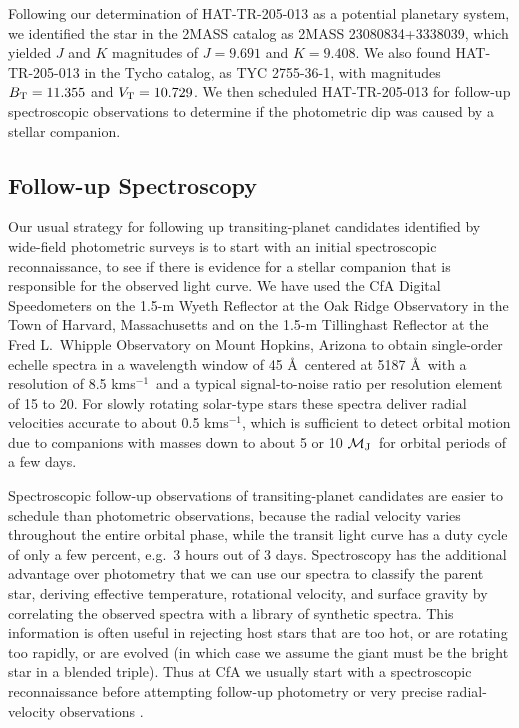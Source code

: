 \documentclass[12pt, preprint]{aastex}
\newcommand\kms{\ifmmode{\rm km\thinspace s^{-1}}\else km\thinspace s$^{-1}$\fi}
\newcommand\mjup{\ifmmode{{\cal M}_{\rm J}}\else ${\cal M}_{\rm J}$\fi}
\begin{document}
Following our determination of HAT-TR-205-013 as a potential planetary
system, we identified the star in the 2MASS catalog as 2MASS
23080834+3338039, which yielded $J$ and $K$ magnitudes of $J=9.691$ and
$K=9.408$. We also found HAT-TR-205-013 in the Tycho catalog, as TYC
2755-36-1, with magnitudes $B_{\rm T} = 11.355$ and $V_{\rm T} = 10.729$.
We then scheduled HAT-TR-205-013 for follow-up spectroscopic
observations to determine if the photometric dip was caused by a
stellar companion.

\subsection{Follow-up Spectroscopy} 

Our usual strategy for following up transiting-planet candidates
identified by wide-field photometric surveys is to start with an
initial spectroscopic reconnaissance, to see if there is evidence for
a stellar companion that is responsible for the observed light curve.
We have used the CfA Digital Speedometers \citep{latham1992} on the
1.5-m Wyeth Reflector at the Oak Ridge Observatory in the Town of
Harvard, Massachusetts and on the 1.5-m Tillinghast Reflector at the
Fred L.\ Whipple Observatory on Mount Hopkins, Arizona to obtain
single-order echelle spectra in a wavelength window of 45 \AA\
centered at 5187 \AA\, with a resolution of 8.5 \kms\ and a typical
signal-to-noise ratio per resolution element of 15 to 20.  For slowly
rotating solar-type stars these spectra deliver radial velocities
accurate to about 0.5 \kms, which is sufficient to detect orbital
motion due to companions with masses down to about 5 or 10 \mjup\ for
orbital periods of a few days.

Spectroscopic follow-up observations of transiting-planet candidates
are easier to schedule than photometric observations, because the
radial velocity varies throughout the entire orbital phase, while the
transit light curve has a duty cycle of only a few percent, e.g.\ 3
hours out of 3 days. Spectroscopy has the additional advantage over
photometry that we can use our spectra to classify the parent star,
deriving effective temperature, rotational velocity, and surface
gravity by correlating the observed spectra with a library of
synthetic spectra. This information is often useful in rejecting host
stars that are too hot, or are rotating too rapidly, or are evolved
(in which case we assume the giant must be the bright star in a
blended triple). Thus at CfA we usually start with a spectroscopic
reconnaissance before attempting follow-up photometry or very precise
radial-velocity observations \citep[e.g.\ see][]{odonovan2007}.
\end{document}
